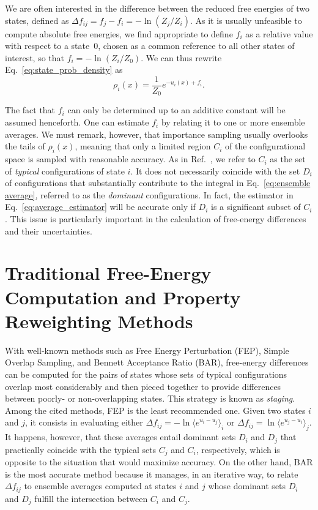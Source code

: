 \documentclass[aip,jcp,reprint,amsmath,amssymb]{revtex4-1}
\begin{document}
We are often interested in the difference between the reduced free energies of two states, defined as $\Delta f_{ij} = f_j - f_i = - \ln (Z_j/Z_i)$. As it is usually unfeasible to compute absolute free energies, we find appropriate to define $f_i$ as a relative value with respect to a state~$0$, chosen as a common reference to all other states of interest, so that $f_i = -\ln (Z_i/Z_0)$. We can thus rewrite Eq.~\eqref{eq:state_prob_density} as
\begin{equation}
\label{eq:state_prob_density_Z0}
\rho_i(x) = \frac{1}{Z_0} e^{-u_i(x)+ f_i}.
\end{equation}

The fact that $f_i$ can only be determined up to an additive constant will be assumed henceforth. One can estimate $f_i$ by relating it to one or more ensemble averages. We must remark, however, that importance sampling usually overlooks the tails of $\rho_i(x)$, meaning that only a limited region $C_i$ of the configurational space is sampled with reasonable accuracy. As in Ref.~, we refer to $C_i$ as the set of \textit{typical} configurations of state $i$. It does not necessarily coincide with the set $D_i$ of configurations that substantially contribute to the integral in Eq.~\eqref{eq:ensemble average}, referred to as the \textit{dominant} configurations. In fact, the estimator in Eq.~\eqref{eq:average_estimator} will be accurate only if $D_i$ is a significant subset of $C_i$. This issue is particularly important in the calculation of free-energy differences and their uncertainties.

\section{Traditional Free-Energy Computation and Property Reweighting Methods}

With well-known methods such as Free Energy Perturbation (FEP),\cite{Zwanzig_1954} Simple Overlap Sampling,\cite{Lee_1980, Lu_2003} and Bennett Acceptance Ratio (BAR),\cite{Bennett_1976} free-energy differences can be computed for the pairs of states whose sets of typical configurations overlap most considerably and then pieced together to provide differences between poorly- or non-overlapping states. This strategy is known as \textit{staging}.\cite{Kofke_1998} Among the cited methods, FEP is the least recommended one. Given two states $i$ and $j$, it consists in evaluating either $\Delta f_{ij} = -\ln \langle e^{u_i - u_j} \rangle_i$ or $\Delta f_{ij} = \ln \langle e^{u_j - u_i} \rangle_j$.\cite{Zwanzig_1954} It happens, however, that these averages entail dominant sets $D_i$ and $D_j$ that practically coincide with the typical sets $C_j$ and $C_i$, respectively, which is opposite to the situation that would maximize accuracy.\cite{Jarzynski_2006} On the other hand, BAR is the most accurate method because it manages, in an iterative way, to relate $\Delta f_{ij}$ to ensemble averages computed at states $i$ and $j$ whose dominant sets $D_i$ and $D_j$ fulfill the intersection between $C_i$ and $C_j$.
\end{document}
